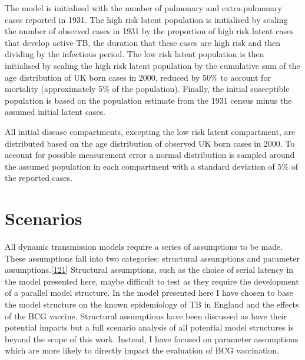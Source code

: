 \documentclass[11pt,twoside]{bristolthesis}
\begin{document}
  The model is initialised with the number of pulmonary and extra-pulmonary cases reported in 1931. The high risk latent population is initialised by scaling the number of observed cases in 1931 by the proportion of high risk latent cases that develop active TB, the duration that these cases are high risk and then dividing by the infectious period. The low risk latent population is then initialised by scaling the high risk latent population by the cumulative sum of the age distribution of UK born cases in 2000, reduced by 50\% to account for mortality (approximately 5\% of the population). Finally, the initial susceptible population is based on the population estimate from the 1931 census minus the assumed initial latent cases.
  
  All initial disease compartments, excepting the low risk latent compartment, are distributed based on the age distribution of observed UK born cases in 2000. To account for possible measurement error a normal distribution is sampled around the assumed population in each compartment with a standard deviation of 5\% of the reported cases.
  
  \hypertarget{scenarios}{%
  \section{Scenarios}\label{scenarios}}
  
  All dynamic transmission models require a series of assumptions to be made. These assumptions fall into two categories: structural assumptions and parameter assumptions.{[}\protect\hyperlink{ref-Dowdy2012}{121}{]} Structural assumptions, such as the choice of serial latency in the model presented here, maybe difficult to test as they require the development of a parallel model structure. In the model presented here I have chosen to base the model structure on the known epidemiology of TB in England and the effects of the BCG vaccine. Structural assumptions have been discussed as have their potential impacts but a full scenario analysis of all potential model structures is beyond the scope of this work. Instead, I have focused on parameter assumptions which are more likely to directly impact the evaluation of BCG vaccination.
  
\end{document}

